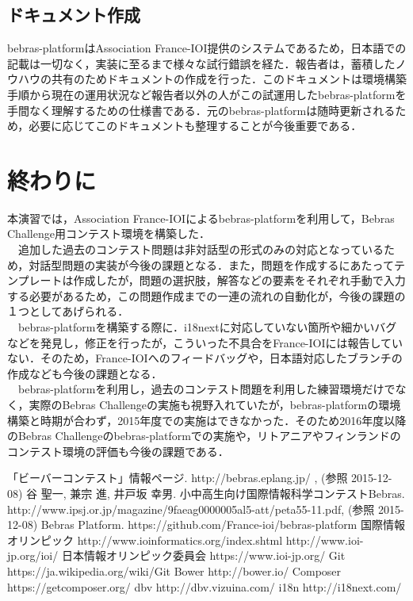 \documentclass[a4paper]{jarticle}
\begin{document}
\begin{multicols}{2}
\subsection{ドキュメント作成}
bebras-platformはAssociation France-IOI提供のシステムであるため，日本語での記載は一切なく，実装に至るまで様々な試行錯誤を経た．報告者は，蓄積したノウハウの共有のためドキュメントの作成を行った．このドキュメントは環境構築手順から現在の運用状況など報告者以外の人がこの試運用したbebras-platformを手間なく理解するための仕様書である．元のbebras-platformは随時更新されるため，必要に応じてこのドキュメントも整理することが今後重要である．

\section{終わりに}
本演習では，Association France-IOIによるbebras-platformを利用して，Bebras Challenge用コンテスト環境を構築した．
\\　追加した過去のコンテスト問題は非対話型の形式のみの対応となっているため，対話型問題の実装が今後の課題となる．また，問題を作成するにあたってテンプレートは作成したが，問題の選択肢，解答などの要素をそれぞれ手動で入力する必要があるため，この問題作成までの一連の流れの自動化が，今後の課題の１つとしてあげられる．
\\　bebras-platformを構築する際に．i18nextに対応していない箇所や細かいバグなどを発見し，修正を行ったが，こういった不具合をFrance-IOIには報告していない．そのため，France-IOIへのフィードバッグや，日本語対応したブランチの作成なども今後の課題となる．
\\　bebras-platformを利用し，過去のコンテスト問題を利用した練習環境だけでなく，実際のBebras Challengeの実施も視野入れていたが，bebras-platformの環境構築と時期が合わず，2015年度での実施はできなかった．そのため2016年度以降のBebras Challengeのbebras-platformでの実施や，リトアニアやフィンランドのコンテスト環境の評価も今後の課題である．

\end{multicols}

\begin{thebibliography}{1}

 「ビーバーコンテスト」情報ページ.  http://bebras.eplang.jp/ , (参照 2015-12-08)
 谷 聖一, 兼宗 進, 井戸坂 幸男. 小中高生向け国際情報科学コンテストBebras.  http://www.ipsj.or.jp/magazine/9faeag0000005al5-att/peta55-11.pdf, (参照 2015-12-08)
 Bebras Platform. https://github.com/France-ioi/bebras-platform
 国際情報オリンピック http://www.ioinformatics.org/index.shtml   http://www.ioi-jp.org/ioi/
日本情報オリンピック委員会 https://www.ioi-jp.org/
 Git  https://ja.wikipedia.org/wiki/Git
Bower  http://bower.io/
Composer  https://getcomposer.org/
dbv  http://dbv.vizuina.com/
i18n  http://i18next.com/



\end{thebibliography}
\end{document}
